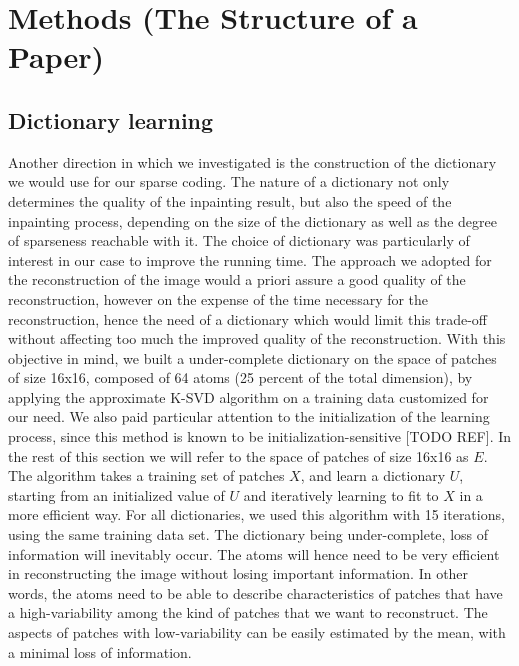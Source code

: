 \section{Methods (The Structure of a Paper)}
\label{sec:methods}
\label{sec:structure-paper}



\subsection{Dictionary learning}

Another direction in which we investigated is the construction of the dictionary we would use for our sparse coding. The nature of a dictionary not only determines the quality of the inpainting result, but also the speed of the inpainting process, depending on the size of the dictionary as well as the degree of sparseness reachable with it. 
The choice of dictionary was particularly of interest in our case to improve the running time. The approach we adopted for the reconstruction of the image would a priori assure a good quality of the reconstruction, however on the expense of the time necessary for the reconstruction, hence the need of a dictionary which would limit this trade-off without affecting too much the improved quality of the reconstruction.
With this objective in mind, we built a under-complete dictionary on the space of patches of size 16x16, composed of 64 atoms (25 percent of the total dimension), by applying the approximate K-SVD algorithm on a training data customized for our need. We also paid particular attention to the initialization of the learning process, since this method is known to be initialization-sensitive [TODO REF]. In the rest of this section we will refer to the space of patches of size 16x16 as $E$.
The algorithm takes a training set of patches $X$, and learn a dictionary $U$, starting from an initialized value of $U$ and iteratively learning to fit to $X$ in a more efficient way. 
For all dictionaries, we used this algorithm with 15 iterations, using the same training data set.
The dictionary being under-complete, loss of information will inevitably occur. The atoms will hence need to be very efficient in reconstructing the image without losing important information. In other words, the atoms need to be able to describe characteristics of patches that have a high-variability among the kind of patches that we want to reconstruct. The aspects of patches with low-variability can be easily estimated by the mean, with a minimal loss of information. 

